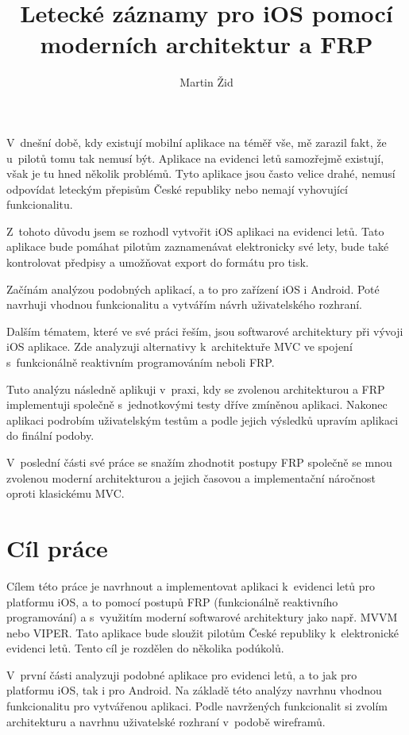 \documentclass[thesis=M,czech]{FITthesis}[2012/06/26]
\title{Letecké záznamy pro iOS pomocí moderních architektur a FRP}
\author{Martin Žid} %
\begin{document}

\begin{introduction}
V~dnešní době, kdy existují mobilní aplikace na téměř vše, mě zarazil fakt, že u~pilotů tomu tak nemusí být. Aplikace na evidenci letů samozřejmě existují, však je tu hned několik problémů. Tyto aplikace jsou často velice drahé, nemusí odpovídat leteckým přepisům České republiky nebo nemají vyhovující funkcionalitu.

Z~tohoto důvodu jsem se rozhodl vytvořit iOS aplikaci na evidenci letů. Tato aplikace bude pomáhat pilotům zaznamenávat elektronicky své lety, bude také kontrolovat předpisy a umožňovat export do formátu pro tisk.

Začínám analýzou podobných aplikací, a to pro zařízení iOS i Android. Poté navrhuji vhodnou funkcionalitu a vytvářím návrh uživatelského rozhraní.

Dalším tématem, které ve své práci řeším, jsou softwarové architektury při vývoji iOS aplikace. Zde analyzuji alternativy k~architektuře MVC ve spojení s~funkcionálně reaktivním programováním neboli FRP.

Tuto analýzu následně aplikuji v~praxi, kdy se zvolenou architekturou a FRP implementuji společně s~jednotkovými testy dříve zmíněnou aplikaci. Nakonec aplikaci podrobím uživatelským testům a podle jejich výsledků
upravím aplikaci do finální podoby.

V~poslední části své práce se snažím zhodnotit postupy FRP společně se mnou zvolenou moderní architekturou a jejich časovou a implementační náročnost oproti klasickému MVC.
\end{introduction}

\chapter{Cíl práce}
Cílem této práce je navrhnout a implementovat aplikaci k~evidenci letů pro platformu iOS, a to pomocí postupů FRP (funkcionálně reaktivního programování) a s~využitím moderní softwarové architektury jako např. MVVM nebo VIPER.  Tato aplikace bude sloužit pilotům České republiky k~elektronické evidenci letů. Tento cíl je rozdělen do několika podúkolů.

V~první části analyzuji podobné aplikace pro evidenci letů, a to jak pro platformu iOS, tak i pro Android. Na základě této analýzy navrhnu vhodnou funkcionalitu pro vytvářenou aplikaci. Podle navržených funkcionalit si zvolím architekturu  a navrhnu uživatelské rozhraní v~podobě wireframů.
\end{document}
